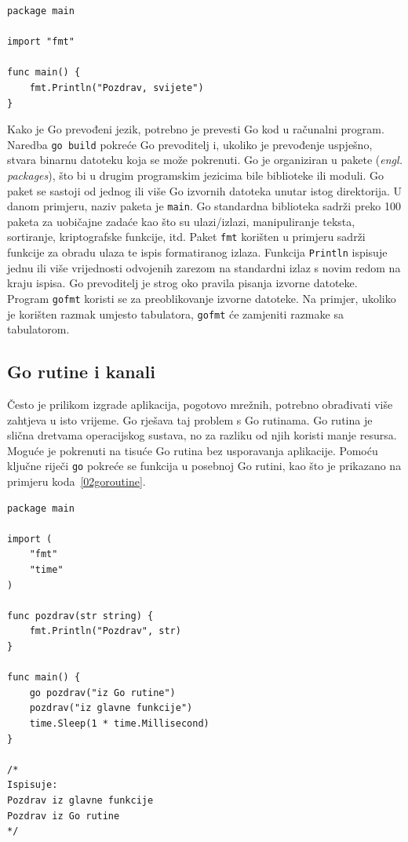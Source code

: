 \begin{lstlisting}[float=h]
package main

import "fmt"

func main() {
    fmt.Println("Pozdrav, svijete")
}
\end{lstlisting}

Kako je Go prevođeni jezik, potrebno je prevesti Go kod u računalni program. Naredba \texttt{go
build} pokreće Go prevoditelj i, ukoliko je prevođenje uspješno, stvara binarnu datoteku koja se
može pokrenuti. Go je organiziran u pakete (\textit{engl. packages}), što bi u drugim programskim
jezicima bile biblioteke ili moduli. Go paket se sastoji od jednog ili više Go izvornih datoteka
unutar istog direktorija. U danom primjeru, naziv paketa je \texttt{main}. Go standardna biblioteka
sadrži preko 100 paketa za uobičajne zadaće kao što su ulazi/izlazi, manipuliranje teksta,
sortiranje, kriptografske funkcije, itd. Paket \texttt{fmt} korišten u primjeru sadrži funkcije za
obradu ulaza te ispis formatiranog izlaza. Funkcija \texttt{Println} ispisuje jednu ili više
vrijednosti odvojenih zarezom na standardni izlaz s novim redom na kraju ispisa. Go prevoditelj je
strog oko pravila pisanja izvorne datoteke. Program \texttt{gofmt} koristi se za preoblikovanje
izvorne datoteke. Na primjer, ukoliko je korišten razmak umjesto tabulatora, \texttt{gofmt} će
zamjeniti razmake sa tabulatorom.

\subsection{Go rutine i kanali}
Često je prilikom izgrade aplikacija, pogotovo mrežnih, potrebno obrađivati više zahtjeva u isto
vrijeme. Go rješava taj problem s Go rutinama. Go rutina je slična dretvama operacijskog sustava,
no za razliku od njih koristi manje resursa. Moguće je pokrenuti na tisuće Go rutina bez usporavanja
aplikacije. Pomoću ključne riječi \texttt{go} pokreće se funkcija u posebnoj Go rutini, kao što je
prikazano na primjeru koda~\ref{02goroutine}.

\begin{lstlisting}[float=h]
package main

import (
    "fmt"
    "time"
)

func pozdrav(str string) {
    fmt.Println("Pozdrav", str)
}

func main() {
    go pozdrav("iz Go rutine")
    pozdrav("iz glavne funkcije")
    time.Sleep(1 * time.Millisecond)
}

/*
Ispisuje:
Pozdrav iz glavne funkcije
Pozdrav iz Go rutine
*/
\end{lstlisting}

